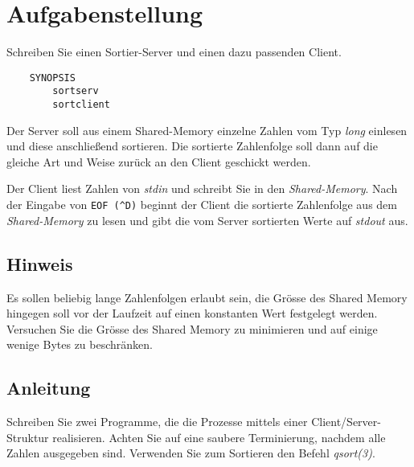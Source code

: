 




\section*{Aufgabenstellung}

Schreiben Sie einen Sortier-Server und einen dazu passenden Client.
\begin{verbatim}
    SYNOPSIS
        sortserv
        sortclient
\end{verbatim}
Der Server soll aus einem Shared-Memory einzelne Zahlen vom Typ \emph{long} einlesen und
diese anschließend sortieren. Die sortierte Zahlenfolge soll dann auf die gleiche Art und
Weise zur\"uck an den Client geschickt werden.

Der Client liest Zahlen von \emph{stdin} und schreibt Sie in den \emph{Shared-Memory}.
Nach der Eingabe von \verb|EOF (^D)| beginnt der Client die sortierte Zahlenfolge aus dem
\emph{Shared-Memory} zu lesen und gibt die vom Server sortierten Werte auf {\em stdout} aus.

\subsection*{Hinweis}
Es sollen beliebig lange Zahlenfolgen erlaubt sein, die Gr\"osse des Shared Memory hingegen soll vor der Laufzeit auf einen konstanten Wert festgelegt werden. Versuchen Sie die Gr\"osse des Shared Memory zu minimieren und auf einige wenige Bytes zu beschr\"anken.

\subsection*{Anleitung}
Schreiben Sie zwei Programme, die die Prozesse mittels einer Client/Server-Struktur realisieren. Achten Sie auf eine saubere Terminierung, nachdem alle Zahlen ausgegeben sind. Verwenden Sie zum Sortieren den Befehl \emph{qsort(3)}.

\osueguidelinesthree


